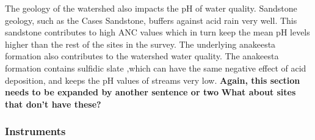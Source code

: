 The geology of the watershed also impacts the pH of water quality.
Sandstone geology, such as the Cases Sandstone, buffers against acid rain very well. 
This sandstone contributes to high ANC values  which in turn keep the mean pH levels higher than the rest of the sites in the survey. 
The underlying anakeesta formation also contributes to the watershed water quality.
The anakeesta formation contains sulfidic slate ,which can have the same negative effect of acid deposition,  and keeps the pH values of streams very low.
\textbf{Again, this section needs to be expanded by  another sentence or two}
\textbf{What about sites that don't have these?}

\subsubsection{Instruments}